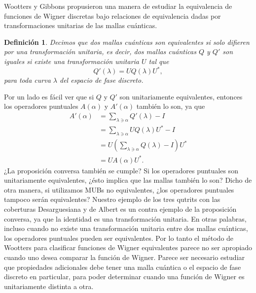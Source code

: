 \documentclass[a4paper]{report}
\newtheorem{definition}{Definición}
\begin{document}
  Wootters y Gibbons propusieron una manera de estudiar la
  equivalencia de funciones de Wigner discretas bajo
  relaciones de equivalencia dadas por transformaciones
  unitarias de las mallas cuánticas.
  \begin{definition}
    Decimos que dos mallas cuánticas son equivalentes si
    solo difieren por una transformación unitaria, es decir,
    dos mallas cuánticas $Q$ y $Q'$ son iguales si existe
    una transformación unitaria $U$ tal que
    \begin{equation}
      Q'(\lambda)
      = U Q(\lambda) U^{*},
    \end{equation}
    para toda curva $\lambda$ del espacio de fase discreto.
  \end{definition}
  Por un lado es fácil ver que si $Q$ y $Q'$ son
  unitariamente equivalentes, entonces los operadores
  puntuales $A(\alpha)$ y $A'(\alpha)$ también lo son, ya
  que
  \begin{align}
    A'(\alpha)
    &= \sum_{\lambda \ni \alpha}^{} Q'(\lambda) - I \\
    &= \sum_{\lambda \ni \alpha}^{} U Q(\lambda) U^{*} - I
    \\
    &= U \left( 
      \sum_{\lambda \ni \alpha}^{} Q(\lambda) - I
    \right) U^{*} \\
    &= U A(\alpha) U^{*}.
  \end{align}
  ¿La proposición conversa también se cumple? Si los
  operadores puntuales son unitariamente equivalentes, ¿ésto
  implica que las mallas también lo son? Dicho de otra
  manera, si utilizamos MUBs no equivalentes, ¿los
  operadores puntuales tampoco serán equivalentes?  Nuestro
  ejemplo de los tres qutrits con las coberturas
  Desarguesiana y de Albert es un contra ejemplo de la
  proposición conversa, ya que la identidad es una
  transformación unitaria. En otras palabras, incluso cuando
  no existe una transformación unitaria entre dos mallas
  cuánticas, los operadores puntuales pueden ser
  equivalentes. Por lo tanto el método de Wootters para
  clasificar funciones de Wigner equivalentes parece no ser
  apropiado cuando uno desea comparar la función de Wigner.
  Parece ser necesario estudiar que propiedades adicionales
  debe tener una malla cuántica o el espacio de fase
  discreto en particular, para poder determinar cuando una
  función de Wigner es unitariamente distinta a otra. 
\end{document}
